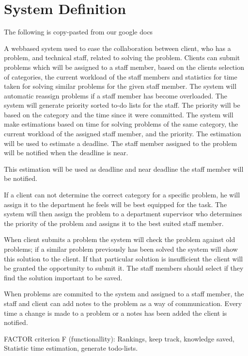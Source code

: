 \section{System Definition}
\label{sec:systemdefinition}

The following is copy-pasted from our google docs

A webbased system used to ease the collaboration between client, who has a problem, and technical staff, related to solving the problem. 
Clients can submit problems which will be assigned to a staff member, based on the clients selection of categories, the current workload of the staff members and statistics for time taken for solving similar problems for the given staff member. 
The system will automatic reassign problems if a staff member has become overloaded.
The system will generate priority sorted to-do lists for the staff. The priority will be based on the category and the time since it were committed.
The system will make estimations based on time for solving problems of the same category, the current workload of the assigned staff member, and the priority. The estimation will be used to estimate a deadline. The staff member assigned to the problem will be notified when the deadline is near.

This estimation will be used as deadline and near deadline the staff member will be notified.

If a client can not determine the correct category for a specific problem, he will assign it to the department he feels will be best equipped for the task. The system will then assign the problem to a department supervisor who determines the priority of the problem and assigns it to the best suited staff member. 

When client submits a problem the system will check the problem against old problems; if a similar problem previously has been solved the system will show this solution to the client. If that particular solution is insufficient the client will be granted the opportunity to submit it. The staff members should select if they find the solution important to be saved.

When problems are commited to the system and assigned to a staff member, the staff and client can add notes to the problem as a way of communication. Every time a change is made to a problem or a notes has been added the client is notified. 




FACTOR criterion
F (functionallity): Rankings, keep track, knowledge saved, Statistic time estimation, generate todo-lists.

